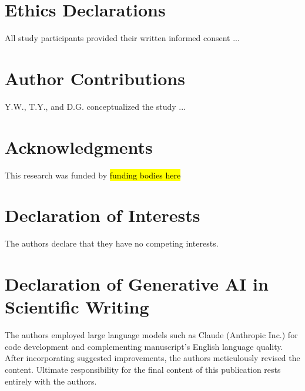 

\section*{Ethics Declarations}
All study participants provided their written informed consent ...
\label{ethics declarations}

\section*{Author Contributions}
Y.W., T.Y., and D.G. conceptualized the study ...
\label{author contributions}

\section*{Acknowledgments}
This research was funded by \hl{funding bodies here}
\label{acknowledgments}

           \section*{Declaration of Interests}
The authors declare that they have no competing interests.
\label{declaration of interests}

\section*{Declaration of Generative AI in Scientific Writing}
The authors employed large language models such as Claude (Anthropic Inc.) for code development and complementing manuscript's English language quality. After incorporating suggested improvements, the authors meticulously revised the content. Ultimate responsibility for the final content of this publication rests entirely with the authors.
\label{declaration of generative ai in scientific writing}

